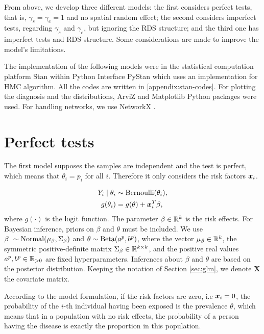 From above, we develop three different models: the first considers perfect
tests, that is, $\gamma_s = \gamma_e = 1$ and no spatial random effect;
the second considers imperfect tests, regarding $\gamma_s$ and $\gamma_e$,
but ignoring the RDS structure; and the third one has imperfect tests and
RDS structure. Some considerations are made to improve the model's
  limitations.

The implementation of the following models were in the statistical computation
platform Stan \cite{carpenter2017stan} within Python Interface PyStan
\cite{pystan} which uses an implementation for HMC algorithm. All the codes
are written in \autoref{appendix:stan-codes}. For plotting the diagnosis and
the distributions, ArviZ \cite{arviz_2019} and Matplotlib \cite{Hunter_2007}
Python packages were used. For handling networks, we use NetworkX
\cite{hagberg2008exploring}.

\section{Perfect tests}

The first model supposes the samples are independent and the test is perfect,
which means that $\theta_i = p_i$ for all $i$. Therefore it only considers the risk factors $\boldsymbol{x}_i$.

\begin{equation}
  \label{model:perfect-tests}
  \begin{aligned}
    Y_i \mid \theta_i & \sim \operatorname{Bernoulli}(\theta_i),      \\
    g(\theta_i)       & = g(\theta) + \boldsymbol{x}_i^T\beta,
  \end{aligned}
\end{equation}
where $g(\cdot)$ is the $\operatorname{logit}$ function.
The parameter $\beta \in \mathbb{R}^{k}$ is the risk effects. For Bayesian inference, priors on
$\beta$ and $\theta$ must be included. We use $\beta ~ \sim \operatorname{Normal}(\mu_{\beta}, \Sigma_{\beta})$
and $\theta \sim \operatorname{Beta}(a^{p}, b^p)$, where the vector $\mu_{\beta}
  \in \mathbb{R}^{k}$, the symmetric positive-definite matrix $\Sigma_{\beta} \in
  \mathbb{R}^{k\times k}$, and the positive real values $a^p, b^p \in \mathbb{R}_{>0}$ are fixed
hyperparameters. Inferences about $\beta$ and $\theta$ are based on the
posterior distribution. Keeping the notation of
Section \ref{sec:glm}, we denote $\boldsymbol{X}$ the covariate matrix.

\begin{remark}
  \label{remark:interpretation-prevalence}
  According to the model formulation, if the risk factors are zero, i.e $\boldsymbol{x}_i
    = 0$, the probability of the $i$-th individual having been exposed is the prevalence $\theta$, which means that in
  a population with no risk effects, the probability of a person having the
  disease is exactly the proportion in this population.
\end{remark}

